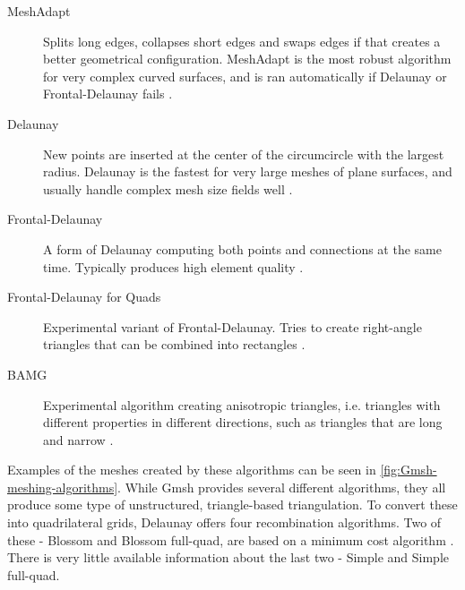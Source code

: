 \begin{description}
    \item[MeshAdapt] Splits long edges, collapses short edges and swaps edges if that creates a better geometrical configuration. MeshAdapt is the most robust algorithm for very complex curved surfaces, and is ran automatically if Delaunay or Frontal-Delaunay fails \cite{Gmsh_reference}.
    \item[Delaunay] New points are inserted at the center of the circumcircle with the largest radius. Delaunay is the fastest for very large meshes of plane surfaces, and usually handle complex mesh size fields well \cite{Gmsh_reference}.
    \item[Frontal-Delaunay] A form of Delaunay computing both points and connections at the same time. Typically produces high element quality \cite{Gmsh_reference}.
    \item[Frontal-Delaunay for Quads] Experimental variant of Frontal-Delaunay. Tries to create right-angle triangles that can be combined into rectangles \cite{Gmsh_reference}.
    \item[BAMG] Experimental algorithm creating anisotropic triangles, i.e. triangles with different properties in different directions, such as triangles that are long and narrow \cite{Gmsh_reference}.
\end{description}

Examples of the meshes created by these algorithms can be seen in \autoref{fig:Gmsh-meshing-algorithms}. While Gmsh provides several different algorithms, they all produce some type of unstructured, triangle-based triangulation. To convert these into quadrilateral grids, Delaunay offers four recombination algorithms. Two of these - Blossom and Blossom full-quad, are based on a minimum cost algorithm \cite{Gmsh_article}. There is very little available information about the last two - Simple and Simple full-quad.

